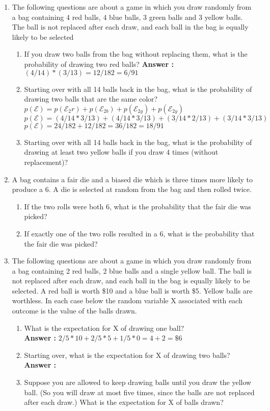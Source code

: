 \documentclass[a4paper,10pt]{article}
\newcommand{\answer}{\textbf{Answer : }}
\newcommand{\E}{\mathcal{E}}
\begin{document}
\begin{enumerate}
\item The following questions are about a game in which you draw randomly from a bag containing 4 red balls, 4 blue balls, 3 green balls and 3 yellow balls. The ball is not replaced after each draw, and each ball in the bag is equally likely to be selected     
    \begin{enumerate}
    \item If you draw two balls from the bag without replacing them, what is the probability of drawing two red balls?
    \answer $(4/14)*(3/13) = 12/182 = 6/91$
    \item Starting over with all 14 balls back in the bag, what is the probability of drawing two balls that are the same color? \\
    $ p(\E) = p(\E_2r) + p(\E_{2b}) + p(\E_{2g}) + p(\E_{2y})$ \\
    $p(\E) = (4/14*3/13)+(4/14*3/13)+(3/14*2/13)+(3/14*3/13)$ \\
    $p(\E) = 24/182 + 12/182 = 36/182 = 18/91$
    \item Starting over with all 14 balls back in the bag, what is the probability of drawing at least two yellow balls if you draw 4 times (without replacement)?
    \end{enumerate}

\item A bag contains a fair die and a biased die which is three times more likely to produce a 6. A die is selected at random from the bag and then rolled twice.
    \begin{enumerate}
    \item If the two rolls were both 6, what is the probability that the fair die was picked?
    \item If exactly one of the two rolls resulted in a 6, what is the probability that the fair die was picked?
    \end{enumerate}

\item The following questions are about a game in which you draw randomly from a bag containing 2 red balls, 2 blue balls and a single yellow ball. The ball is not replaced after each draw, and each ball in the bag is equally likely to be selected. A red ball is worth \$10 and a blue ball is worth \$5. Yellow balls are worthless. In each case below the random variable X associated with each outcome is the value of the balls drawn.
    \begin{enumerate}
    \item What is the expectation for X of drawing one ball? \\
    \answer $2/5 * 10 + 2/5* 5 + 1/5 * 0 = 4+2 = \$6$
    \item Starting over, what is the expectation for X of drawing two balls? \\
    \answer $ $
    \item Suppose you are allowed to keep drawing balls until you draw the yellow ball. (So you will draw at most five times, since the balls are not replaced after each draw.) What is the expectation for X of balls drawn?
    \end{enumerate}

\end{enumerate}
\end{document}
